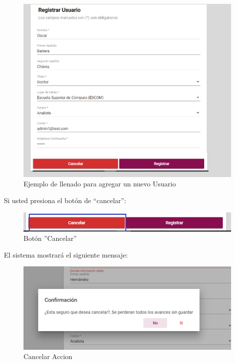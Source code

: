             \begin{figure}[!hbtp]
                \centering
                \hypertarget{ejreg}{\includegraphics[width=0.7\linewidth]{images/SP5/Registro-Usuario-UA}}
                \caption{Ejemplo de llenado para agregar un nuevo Usuario}
                \label{ejreg}
            \end{figure}
    
    \newpage
            Si usted presiona el botón de “cancelar”: 
            
            \begin{figure}[!hbtp]
                \centering
                \hypertarget{cancel1}{\includegraphics[width=0.7\linewidth]{images/SP5/BtnCancelar1}}
                \caption{Botón ''Cancelar''}
                \label{cancel1}
            \end{figure}
            
            El sistema mostrará el siguiente mensaje:

            
             \begin{figure}[!hbtp]
            	\centering
            \includegraphics[width=0.4\linewidth]{images/SP5/MSG29}
            	\caption{Cancelar Accion}
            	\label{mensaje29}
            \end{figure}    
        
